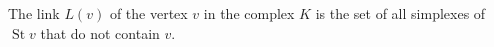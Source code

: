 The link $L(v)$ of the vertex $v$ in the complex $K$ is the set of all simplexes of $\operatorname{St} v$ that do not contain $v$.
